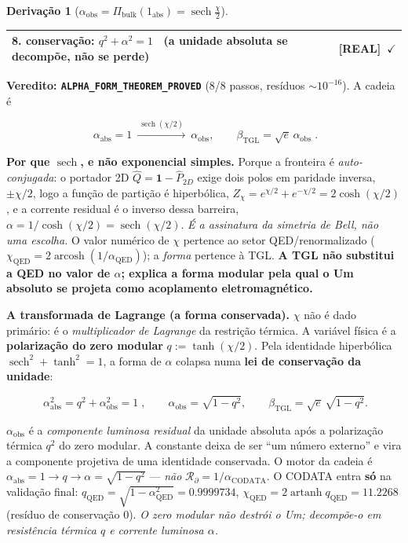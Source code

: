 \documentclass[11pt]{article}
\newcommand{\bTGL}{\beta_{\mathrm{TGL}}}\newcommand{\Msun}{M_{\odot}}\newcommand{\TGL}{\mathrm{TGL}}
\theoremstyle{definition}\newtheorem{deriv}{Derivação}
\begin{document}
\begin{deriv}[$\alpha_{\mathrm{obs}}=\Pi_{\mathrm{bulk}}(1_{\mathrm{abs}})=\operatorname{sech}\tfrac\chi2$]
\begin{center}
\begin{tabular}{p{} l}
8. \textbf{conservação}: $q^2+\alpha^2=1$ \ (a unidade absoluta se decompõe, não se perde) & \textsf{[REAL]}~$\checkmark$ \\

\hline\end{tabular}\end{center}

\textbf{Veredito: \texttt{ALPHA\_FORM\_THEOREM\_PROVED}} (8/8 passos, resíduos $\sim10^{-16}$). A cadeia é

\begin{equation}\boxed{\;\alpha_{\mathrm{abs}}=1\ \xrightarrow{\ \operatorname{sech}(\chi/2)\ }\ \alpha_{\mathrm{obs}},\qquad \bTGL=\sqrt e\,\alpha_{\mathrm{obs}}\;}.\end{equation}

\textbf{Por que $\operatorname{sech}$, e não exponencial simples.} Porque a fronteira é \emph{auto-conjugada}: o portador 2D $\hat Q=\mathbf 1-\hat P_{2D}$ exige dois polos em paridade inversa, $\pm\chi/2$, logo a função de partição é hiperbólica, $Z_\chi=e^{\chi/2}+e^{-\chi/2}=2\cosh(\chi/2)$, e a corrente residual é o inverso dessa barreira, $\alpha=1/\cosh(\chi/2)=\operatorname{sech}(\chi/2)$. \emph{É a assinatura da simetria de Bell, não uma escolha.} O valor numérico de $\chi$ pertence ao setor QED/renormalizado ($\chi_{\mathrm{QED}}=2\operatorname{arcosh}(1/\alpha_{\mathrm{QED}})$); a \emph{forma} pertence à TGL. \textbf{A TGL não substitui a QED no valor de $\alpha$; explica a forma modular pela qual o Um absoluto se projeta como acoplamento eletromagnético.}

\textbf{A transformada de Lagrange (a forma conservada).} $\chi$ não é dado primário: é o \emph{multiplicador de Lagrange} da restrição térmica. A variável física é a \textbf{polarização do zero modular} $q:=\tanh(\chi/2)$. Pela identidade hiperbólica $\operatorname{sech}^2+\tanh^2=1$, a forma de $\alpha$ colapsa numa \textbf{lei de conservação da unidade}:

\begin{equation}\boxed{\;\alpha_{\mathrm{abs}}^2=q^2+\alpha_{\mathrm{obs}}^2=1\;},\qquad \alpha_{\mathrm{obs}}=\sqrt{1-q^2},\qquad \bTGL=\sqrt e\,\sqrt{1-q^2}.\end{equation}

$\alpha_{\mathrm{obs}}$ é a \emph{componente luminosa residual} da unidade absoluta após a polarização térmica $q^2$ do zero modular. A constante deixa de ser ``um número externo'' e vira a componente projetiva de uma identidade conservada. O motor da cadeia é $\alpha_{\mathrm{abs}}=1\to q\to\alpha=\sqrt{1-q^2}$ --- \emph{não} $\mathcal R_\partial=1/\alpha_{\mathrm{CODATA}}$. O CODATA entra \textbf{só} na validação final: $q_{\mathrm{QED}}=\sqrt{1-\alpha_{\mathrm{QED}}^2}=0.9999734$, $\chi_{\mathrm{QED}}=2\operatorname{artanh}q_{\mathrm{QED}}=11.2268$ (resíduo de conservação $0$). \emph{O zero modular não destrói o Um; decompõe-o em resistência térmica $q$ e corrente luminosa $\alpha$.}\end{deriv}
\end{document}
